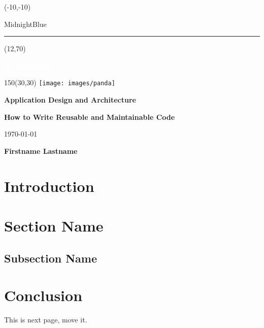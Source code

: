 \documentclass{report}
\begin{document}
    \setlength{\TPHorizModule}{1mm}
    \setlength{\TPVertModule}{1mm}

    \begin{titlepage}
        \begin{textblock}{50}(-10,-10)
            \begin{color}{MidnightBlue}
                \rule{3cm}{30cm} %
            \end{color}
        \end{textblock}

        \begin{textblock}{20}(12,70) %
            \begin{rotate}{90}
            {\huge\bfseries \textcolor{white}{Programming}}
            \end{rotate}
        \end{textblock}

        \begin{textblock}{150}(30,30) %
            \texttt{[image: images/panda]}\medskip

            {\huge\bfseries Application Design and Architecture }\medskip

            {\Large\bfseries How to Write Reusable and Maintainable Code }\medskip

            {\large\today}\vspace{10mm}

            {\large\bfseries Firstname Lastname}
        \end{textblock}

        \setlength{\cftbeforetoctitleskip}{300pt} %
        \setlength{\cftaftertoctitleskip}{20pt}
        \tableofcontents

        \thispagestyle{empty} %
	\end{titlepage}


    \section{Introduction}
    \section{Section Name}
    \subsection{Subsection Name}
    \section{Conclusion}
    This is next page, move it.
\end{document}
